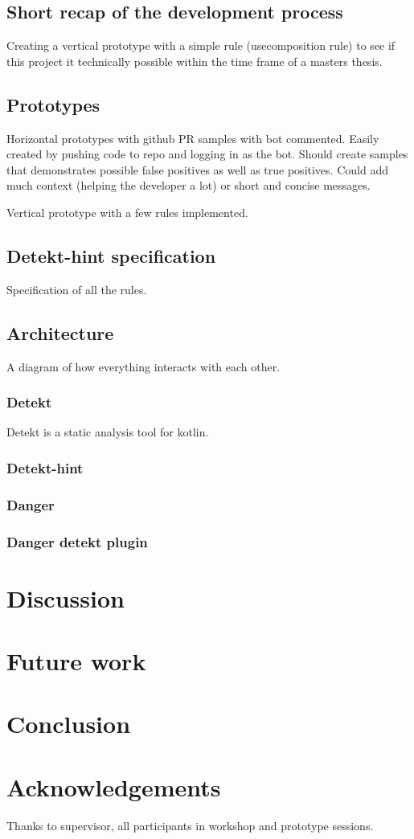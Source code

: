 \documentclass{article}
\begin{document}
\subsection{Short recap of the development process}
Creating a vertical prototype with a simple rule (usecomposition rule) to see if this project it technically possible within the time frame of a masters thesis. 



\subsection{Prototypes}
Horizontal prototypes with github PR samples with bot commented. Easily created by pushing code to repo and logging in as the bot. Should create samples that demonstrates possible false positives as well as true positives. Could add much context (helping the developer a lot) or short and concise messages.

Vertical prototype with a few rules implemented.

\subsection{Detekt-hint specification}
Specification of all the rules.

\subsection{Architecture}
A diagram of how everything interacts with each other.

\subsubsection{Detekt}
Detekt is a static analysis tool for kotlin.
\subsubsection{Detekt-hint}

\subsubsection{Danger}

\subsubsection{Danger detekt plugin}

\section{Discussion}
\label{discussion}

\section{Future work}


\section{Conclusion}
\label{conclusion}

\section{Acknowledgements}
\label{acknowledgements}
Thanks to supervisor, all participants in workshop and prototype sessions.

\printbibliography

\appendix
\label{appendix}

\end{document}
